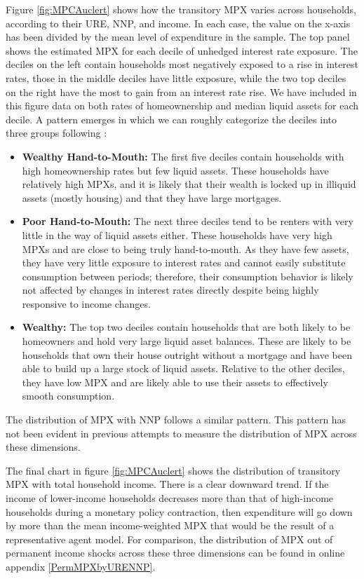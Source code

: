 \documentclass[titlepage]{\econtex}\newcommand{\texname}{ConsumptionHeterogeneity}
\begin{document}
	Figure \ref{fig:MPCAuclert} shows how the transitory MPX varies across households, according to their URE, NNP, and income. In each case, the value on the x-axis has been divided by the mean level of expenditure in the sample. The top panel shows the estimated MPX for each decile of unhedged interest rate exposure. The deciles on the left contain households most negatively exposed to a rise in interest rates, those in the middle deciles have little exposure, while the two top deciles on the right have the most to gain from an interest rate rise. We have included in this figure data on both rates of homeownership and median liquid assets for each decile. A pattern emerges in which we can roughly categorize the deciles into three groups following \cite{violante_wealthy_2014}:
	\begin{itemize}
		\item \textbf{Wealthy Hand-to-Mouth:} The first five deciles contain households with high homeownership rates but few liquid assets. These households have relatively high MPXs, and it is likely that their wealth is locked up in illiquid assets (mostly housing) and that they have large mortgages.
		\item \textbf{Poor Hand-to-Mouth:} The next three deciles tend to be renters with very little in the way of liquid assets either. These households have very high MPXs and are close to being truly hand-to-mouth. As they have few assets, they have very little exposure to interest rates and cannot easily substitute consumption between periods; therefore, their consumption behavior is likely not affected by changes in interest rates directly despite being highly responsive to income changes.
		\item \textbf{Wealthy:} The top two deciles contain households that are both likely to be homeowners and hold very large liquid asset balances. These are likely to be households that own their house outright without a mortgage and have been able to build up a large stock of liquid assets. Relative to the other deciles, they have low MPX and are likely able to use their assets to effectively smooth consumption.
	\end{itemize}
	
	The distribution of MPX with NNP follows a similar pattern. This pattern has not been evident in previous attempts to measure the distribution of MPX across these dimensions. 
	
	The final chart in figure \ref{fig:MPCAuclert} shows the distribution of transitory MPX with total household income. There is a clear downward trend. If the income of lower-income households decreases more than that of high-income households during a monetary policy contraction, then expenditure will go down by more than the mean income-weighted MPX that would be the result of a representative agent model. For comparison, the distribution of  MPX out of permanent income shocks across these three dimensions can be found in online appendix \ref{PermMPXbyURENNP}.
	
\end{document}
